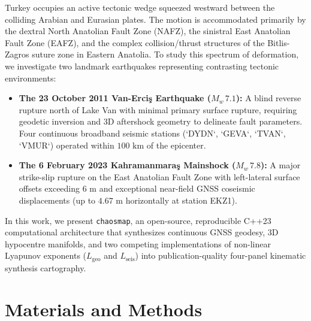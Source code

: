 \documentclass[11pt,a4paper]{article}
\begin{document}
Turkey occupies an active tectonic wedge squeezed westward between the colliding Arabian and Eurasian plates. The motion is accommodated primarily by the dextral North Anatolian Fault Zone (NAFZ), the sinistral East Anatolian Fault Zone (EAFZ), and the complex collision/thrust structures of the Bitlis-Zagros suture zone in Eastern Anatolia. To study this spectrum of deformation, we investigate two landmark earthquakes representing contrasting tectonic environments:
\begin{itemize}
    \item \textbf{The 23 October 2011 Van-Erci\c{s} Earthquake ($M_w\,7.1$):} A blind reverse rupture north of Lake Van with minimal primary surface rupture, requiring geodetic inversion and 3D aftershock geometry to delineate fault parameters. Four continuous broadband seismic stations (`DYDN`, `GEVA`, `TVAN`, `VMUR`) operated within $100\text{ km}$ of the epicenter.
    \item \textbf{The 6 February 2023 Kahramanmara\c{s} Mainshock ($M_w\,7.8$):} A major strike-slip rupture on the East Anatolian Fault Zone with left-lateral surface offsets exceeding $6\text{ m}$ and exceptional near-field GNSS coseismic displacements (up to $4.67\text{ m}$ horizontally at station EKZ1).
\end{itemize}

In this work, we present \texttt{chaosmap}, an open-source, reproducible C++23 computational architecture that synthesizes continuous GNSS geodesy, 3D hypocentre manifolds, and two competing implementations of non-linear Lyapunov exponents ($L_{\text{geo}}$ and $L_{\text{seis}}$) into publication-quality four-panel kinematic synthesis cartography.

\section{Materials and Methods}
\end{document}

